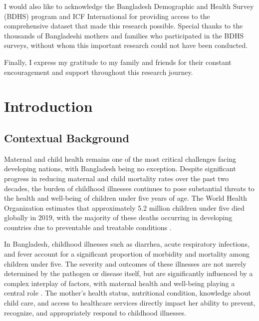 \documentclass[12pt]{report}
\begin{document}
\noindent I would also like to acknowledge the Bangladesh Demographic and Health Survey (BDHS) program and ICF International for providing access to the comprehensive dataset that made this research possible. Special thanks to the thousands of Bangladeshi mothers and families who participated in the BDHS surveys, without whom this important research could not have been conducted.

\noindent Finally, I express my gratitude to my family and friends for their constant encouragement and support throughout this research journey.

\newpage
\renewcommand*\contentsname{Table of Contents}
\tableofcontents

\listoffigures
\listoftables
{}

\chapter{Introduction}

\justifying

\section{Contextual Background}

Maternal and child health remains one of the most critical challenges facing developing nations, with Bangladesh being no exception. Despite significant progress in reducing maternal and child mortality rates over the past two decades, the burden of childhood illnesses continues to pose substantial threats to the health and well-being of children under five years of age. The World Health Organization estimates that approximately 5.2 million children under five died globally in 2019, with the majority of these deaths occurring in developing countries due to preventable and treatable conditions \cite{ref1}.

In Bangladesh, childhood illnesses such as diarrhea, acute respiratory infections, and fever account for a significant proportion of morbidity and mortality among children under five. The severity and outcomes of these illnesses are not merely determined by the pathogen or disease itself, but are significantly influenced by a complex interplay of factors, with maternal health and well-being playing a central role \cite{ref2}. The mother's health status, nutritional condition, knowledge about child care, and access to healthcare services directly impact her ability to prevent, recognize, and appropriately respond to childhood illnesses.
\end{document}
